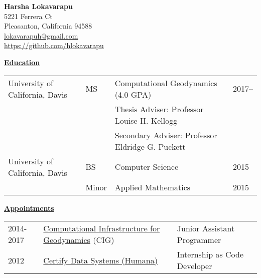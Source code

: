 \documentclass[11pt]{ltxdoc}
\begin{document}
\begin{center}
  \textbf{Harsha Lokavarapu}                                            \\ [06pt]
  5221 Ferrera Ct                                                       \\
  Pleasanton, California 94588                                          \\
 \href{mailto:lokavarapuh@gmail.com}{lokavarapuh@gmail.com}             \\
  \href{https://github.com/hlokavarapu}{https://github.com/hlokavarapu} \\ [3pt]
\end{center}


\vskip 12pt

\begin{center}
	\textbf{\underline{Education}}
\end{center}

\vskip -06pt

\begin{tabular}{llll}
University of California, Davis              &MS       &Computational Geodynamics (4.0 GPA)      & 2017-- \\
                                             &       &Thesis Adviser: Professor Louise H. Kellogg           &  \\
                                                                                          &       &Secondary Adviser: Professor Eldridge G. Puckett           &  \\
University of California, Davis              &BS      & Computer Science                         & 2015       \\
                                             &Minor   & Applied Mathematics                      & 2015
\end{tabular}

\vskip 18pt

\begin{center}
	\textbf{\underline{Appointments}}
\end{center}

\begin{tabular}{lll}
2014-2017     & \href{https://geodynamics.org/cig/}{Computational Infrastructure for Geodynamics} (CIG) & Junior Assistant Programmer \\
2012       & \href{https://www.humana.com}{Certify Data Systems (Humana)} & Internship as Code Developer
\end{tabular}
\end{document}
